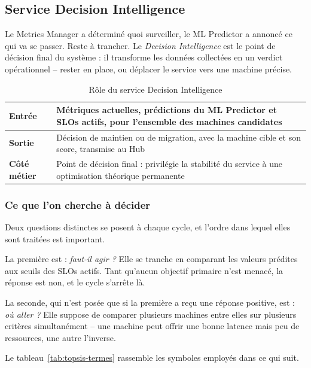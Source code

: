 \subsection{Service Decision Intelligence}

Le Metrics Manager a déterminé quoi surveiller, le ML Predictor a annoncé ce qui va se passer. Reste à trancher. Le \emph{Decision Intelligence} est le point de décision final du système : il transforme les données collectées en un verdict opérationnel -- rester en place, ou déplacer le service vers une machine précise.

\begin{table}[H]
    \centering
    \begin{tabular}{|p{2.8cm}|p{10.5cm}|}
        \hline
        \textbf{Entrée} & Métriques actuelles, prédictions du ML Predictor et SLOs actifs, pour l'ensemble des machines candidates \\
        \hline
        \textbf{Sortie} & Décision de maintien ou de migration, avec la machine cible et son score, transmise au Hub \\
        \hline
        \textbf{Côté métier} & Point de décision final : privilégie la stabilité du service à une optimisation théorique permanente \\
        \hline
    \end{tabular}
    \caption{Rôle du service Decision Intelligence}
    \label{tab:decision-role}
\end{table}

\subsubsection{Ce que l'on cherche à décider}

Deux questions distinctes se posent à chaque cycle, et l'ordre dans lequel elles sont traitées est important.

La première est : \emph{faut-il agir ?} Elle se tranche en comparant les valeurs prédites aux seuils des SLOs actifs. Tant qu'aucun objectif primaire n'est menacé, la réponse est non, et le cycle s'arrête là.

La seconde, qui n'est posée que si la première a reçu une réponse positive, est : \emph{où aller ?} Elle suppose de comparer plusieurs machines entre elles sur plusieurs critères simultanément -- une machine peut offrir une bonne latence mais peu de ressources, une autre l'inverse.

Le tableau~\ref{tab:topsis-termes} rassemble les symboles employés dans ce qui suit.


